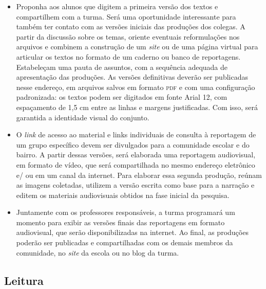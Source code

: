 \documentclass[12pt]{extarticle}
\begin{document}
\begin{itemize}
\item
  Proponha aos alunos que digitem a primeira versão dos textos e
  compartilhem com a turma. Será uma oportunidade interessante para
  também ter contato com as versões iniciais das produções dos colegas.
  A partir da discussão sobre os temas, oriente eventuais reformulações
  nos arquivos e combinem a construção de um \emph{site} ou de uma
  página virtual para articular os textos no formato de um caderno ou
  banco de reportagens. Estabeleçam uma pauta de assuntos, com a
  sequência adequada de apresentação das produções. As versões
  definitivas deverão ser publicadas nesse endereço, em arquivos salvos
  em formato \textsc{pdf} e com uma configuração padronizada: os textos podem ser
  digitados em fonte Arial 12, com espaçamento de 1,5 cm entre as linhas
  e margens justificadas. Com isso, será garantida a identidade visual
  do conjunto.
\item
  O \emph{link} de acesso ao material e links individuais de consulta à
  reportagem de um grupo específico devem ser divulgados para a
  comunidade escolar e do bairro. A partir dessas versões, será
  elaborada uma reportagem audiovisual, em formato de vídeo, que será
  compartilhada no mesmo endereço eletrônico e/ ou em um canal da
  internet. Para elaborar essa segunda produção, reúnam as imagens
  coletadas, utilizem a versão escrita como base para a narração e
  editem os materiais audiovisuais obtidos na fase inicial da pesquisa.
\item
  Juntamente com os professores responsáveis, a turma programará um
  momento para exibir as versões finais das reportagens em formato
  audiovisual, que serão disponibilizadas na internet. Ao final, as
  produções poderão ser publicadas e compartilhadas com os demais
  membros da comunidade, no \emph{site} da escola ou no blog da turma.
\end{itemize}

\subsection{Leitura}
\end{document}

